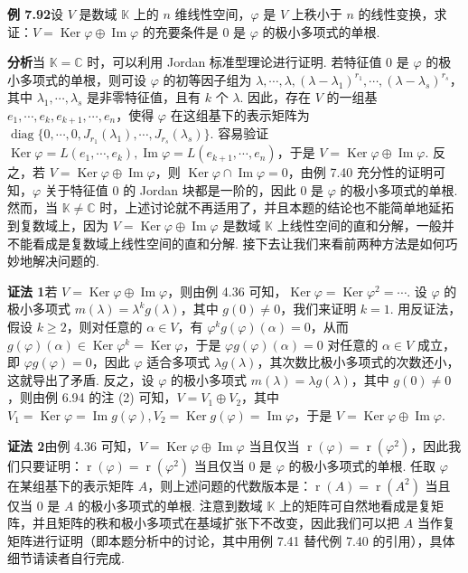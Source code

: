 \documentclass[UTF8, 12pt, fontset=fandol, oneside]{ctexart}
\begin{document}
\noindent\textbf{例 7.92}\quad 设 $V$ 是数域 $\mathbb{K}$ 上的 $n$ 维线性空间，$\varphi$ 是 $V$ 上秩小于 $n$ 的线性变换，求证：$V=\operatorname{Ker}\varphi\oplus\operatorname{Im}\varphi$ 的充要条件是 0 是 $\varphi$ 的极小多项式的单根.

\noindent\textbf{分析}\quad 当 $\mathbb{K}=\mathbb{C}$ 时，可以利用 Jordan 标准型理论进行证明. 若特征值 0 是 $\varphi$ 的极小多项式的单根，则可设 $\varphi$ 的初等因子组为 $\lambda,\cdots,\lambda,(\lambda-\lambda_1)^{r_1},\cdots,(\lambda-\lambda_s)^{r_s}$，其中 $\lambda_1,\cdots,\lambda_s$ 是非零特征值，且有 $k$ 个 $\lambda$. 因此，存在 $V$ 的一组基 $e_1,\cdots,e_k,e_{k+1},\cdots,e_n$，使得 $\varphi$ 在这组基下的表示矩阵为 $\operatorname{diag}\{0,\cdots,0,J_{r_1}(\lambda_1),\cdots,J_{r_s}(\lambda_s)\}$. 容易验证 $\operatorname{Ker}\varphi=L(e_1,\cdots,e_k),\operatorname{Im}\varphi=L(e_{k+1},\cdots,e_n)$，于是 $V=\operatorname{Ker}\varphi\oplus\operatorname{Im}\varphi$. 反之，若 $V=\operatorname{Ker}\varphi\oplus\operatorname{Im}\varphi$，则 $\operatorname{Ker}\varphi\cap\operatorname{Im}\varphi=0$，由例 7.40 充分性的证明可知，$\varphi$ 关于特征值 0 的 Jordan 块都是一阶的，因此 0 是 $\varphi$ 的极小多项式的单根. 然而，当 $\mathbb{K}\ne\mathbb{C}$ 时，上述讨论就不再适用了，并且本题的结论也不能简单地延拓到复数域上，因为 $V=\operatorname{Ker}\varphi\oplus\operatorname{Im}\varphi$ 是数域 $\mathbb{K}$ 上线性空间的直和分解，一般并不能看成是复数域上线性空间的直和分解. 接下去让我们来看前两种方法是如何巧妙地解决问题的.

\noindent\textbf{证法 1}\quad 若 $V=\operatorname{Ker}\varphi\oplus\operatorname{Im}\varphi$，则由例 4.36 可知，$\operatorname{Ker}\varphi=\operatorname{Ker}\varphi^2=\cdots$. 设 $\varphi$ 的极小多项式 $m(\lambda)=\lambda^kg(\lambda)$，其中 $g(0)\ne0$，我们来证明 $k=1$. 用反证法，假设 $k\ge2$，则对任意的 $\alpha\in V$，有 $\varphi^kg(\varphi)(\alpha)=0$，从而 $g(\varphi)(\alpha)\in\operatorname{Ker}\varphi^k=\operatorname{Ker}\varphi$，于是 $\varphi g(\varphi)(\alpha)=0$ 对任意的 $\alpha\in V$ 成立，即 $\varphi g(\varphi)=0$，因此 $\varphi$ 适合多项式 $\lambda g(\lambda)$，其次数比极小多项式的次数还小，这就导出了矛盾. 反之，设 $\varphi$ 的极小多项式 $m(\lambda)=\lambda g(\lambda)$，其中 $g(0)\ne0$，则由例 6.94 的注 (2) 可知，$V=V_1\oplus V_2$，其中 $V_1=\operatorname{Ker}\varphi=\operatorname{Im}g(\varphi),V_2=\operatorname{Ker}g(\varphi)=\operatorname{Im}\varphi$，于是 $V=\operatorname{Ker}\varphi\oplus\operatorname{Im}\varphi$.

\noindent\textbf{证法 2}\quad 由例 4.36 可知，$V=\operatorname{Ker}\varphi\oplus\operatorname{Im}\varphi$ 当且仅当 $\operatorname{r}(\varphi)=\operatorname{r}(\varphi^2)$，因此我们只要证明：$\operatorname{r}(\varphi)=\operatorname{r}(\varphi^2)$ 当且仅当 0 是 $\varphi$ 的极小多项式的单根. 任取 $\varphi$ 在某组基下的表示矩阵 $A$，则上述问题的代数版本是：$\operatorname{r}(A)=\operatorname{r}(A^2)$ 当且仅当 0 是 $A$ 的极小多项式的单根. 注意到数域 $\mathbb{K}$ 上的矩阵可自然地看成是复矩阵，并且矩阵的秩和极小多项式在基域扩张下不改变，因此我们可以把 $A$ 当作复矩阵进行证明（即本题分析中的讨论，其中用例 7.41 替代例 7.40 的引用），具体细节请读者自行完成.
\end{document}
